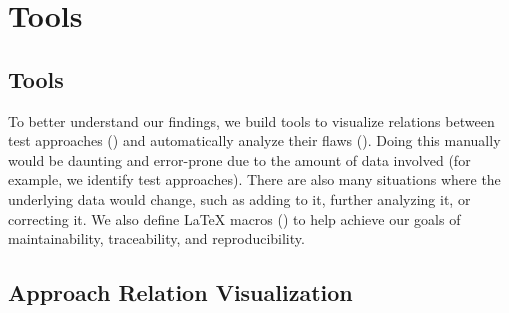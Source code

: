 \ifnotpaper\section{Tools}
\else\subsection{Tools}
\fi\label{tools}

\ifnotpaper
    To better understand our findings, we build tools to
    visualize relations between test approaches () and
    automatically analyze their flaws (). Doing
    this manually would be daunting and error-prone due to the amount of
    data involved (for example, we identify \approachCount{} test approaches).
    There are also many situations where the underlying data would change, such
    as adding to it, further analyzing it, or correcting it. %
    We also define \LaTeX{} macros () to help achieve our
    goals of maintainability, traceability, and reproducibility.

    \subsection{Approach Relation Visualization}\label{app-rel-vis}
\else
    \flawMnfstsTable{}
    \flawDmnsTable{}
\fi

